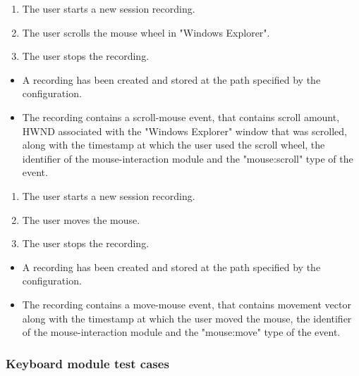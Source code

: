 \begin{tests}
	{\begin{enumerate}
		\item The user starts a new session recording.
		\item The user scrolls the mouse wheel in "Windows Explorer".
		\item The user stops the recording.
	\end{enumerate}}
	{\begin{itemize}
		\item A recording has been created and stored at the path specified by the configuration.
		\item The recording contains a scroll-mouse event, that contains scroll amount, HWND associated with the "Windows Explorer" window that was scrolled, along with the timestamp at which the user used the scroll wheel, the identifier of the mouse-interaction module and the "mouse:scroll" type of the event.
	\end{itemize}}
	
	{\begin{enumerate}
		\item The user starts a new session recording.
		\item The user moves the mouse.
		\item The user stops the recording.
	\end{enumerate}}
	{\begin{itemize}
		\item A recording has been created and stored at the path specified by the configuration.
		\item The recording contains a move-mouse event, that contains movement vector along with the timestamp at which the user moved the mouse, the identifier of the mouse-interaction module and the "mouse:move" type of the event.
	\end{itemize}}
\end{tests}

\subsubsection{Keyboard module test cases}

